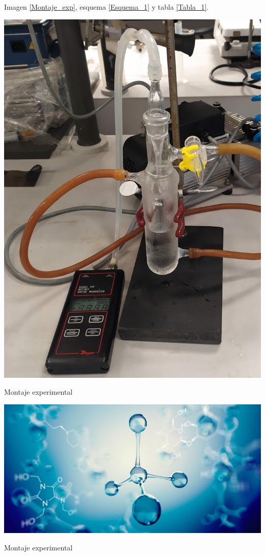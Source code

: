 \documentclass[11pt,fleqn]{article} %
\begin{document}
\begin{multicols}{2}
		Imagen \ref{Montaje_exp}, esquema \ref{Esquema_1} y tabla \ref{Tabla_1}.
		
		\linhor %
		\begin{imagen}
			\centering
			\includegraphics[scale=0.05]{Imagenes/Montaje.png}
			\caption{Montaje experimental} 
			\label{Montaje_exp}	
			\linhor
		\end{imagen}
		
		\linhor 
		\begin{esquema}
			\centering
			\includegraphics[scale=0.2]{Imagenes/Esquema.jpg}
			\caption{Montaje experimental} 
			\label{Esquema_1}	
			\linhor
		\end{esquema}
				

\end{multicols}
\end{document}
